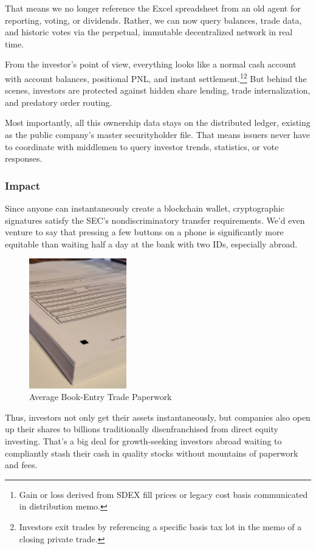 \documentclass[11pt, english]{article}
\begin{document}
\begin{multicols}{2}
That means we no longer reference the Excel spreadsheet from an old agent for reporting, voting, or dividends. Rather, we can now query balances, trade data, and historic votes via the perpetual, immutable decentralized network in real time.

From the investor's point of view, everything looks like a normal cash account with account balances, positional PNL, and instant settlement.\footnote{Gain or loss derived from SDEX fill prices or legacy cost basis communicated in distribution memo.}\footnote{Investors exit trades by referencing a specific basis tax lot in the memo of a closing private trade.} But behind the scenes, investors are protected against hidden share lending, trade internalization, and predatory order routing.

Most importantly, all this ownership data stays on the distributed ledger, existing as the public company's master securityholder file. That means issuers never have to coordinate with middlemen to query investor trends, statistics, or vote responses.

\subsubsection{Impact}

Since anyone can instantaneously create a blockchain wallet, cryptographic signatures satisfy the SEC's nondiscriminatory transfer requirements. We'd even venture to say that pressing a few buttons on a phone is significantly more equitable than waiting half a day at the bank with two IDs, especially abroad.

\begin{figure}[H]
    \centering
    \includegraphics[width=120pt]{imgs/paperwork.jpg}
    \caption{Average Book-Entry Trade Paperwork}
\end{figure}

Thus, investors not only get their assets instantaneously, but companies also open up their shares to billions traditionally disenfranchised from direct equity investing. That's a big deal for growth-seeking investors abroad waiting to compliantly stash their cash in quality stocks without mountains of paperwork and fees.


\end{multicols}
\end{document}
